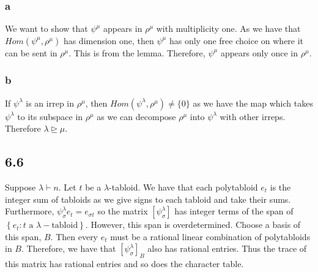 \documentclass[]{article}
\begin{document}
\subsubsection*{a}
We want to show that $\psi^\mu$ appears in $\rho^\mu$ with multiplicity one. As we have that $Hom(\psi^\mu, \rho^\mu)$ has dimension one, then $\psi^\mu$ has only one free choice on where it can be sent in $\rho^\mu$. This is from the lemma. Therefore, $\psi^\mu$ appears only once in $\rho^\mu$. 

\subsubsection*{b}
If $\psi^\lambda$ is an irrep in $\rho^\mu$, then $Hom(\psi^\lambda, \rho^\mu) \neq \{ 0 \}$ as we have the map which takes $\psi^\lambda$ to its subspace in $\rho^\mu$ as we can decompose $\rho^\mu$ into $\psi^\lambda$ with other irreps. Therefore $\lambda \unrhd  \mu$. 

\subsection*{6.6}
Suppose $\lambda \vdash n$. Let $t$ be a $\lambda$-tabloid.
We have that each polytabloid $e_t$ is the integer sum of tabloids as we give signs to each tabloid and take their sums. Furthermore, $\psi^\lambda_\sigma e_t = e_{\sigma t}$ so the matrix $\left[\psi^\lambda_\sigma\right]$ has integer terms of the span of $\left\{ e_{t}: t \text{ a } \lambda- \text{tabloid}\right\}$. However, this span is overdetermined. Choose a basis of this span, $B$. Then every $e_t$ must be a rational linear combination of polytabloids in $B$. Therefore, we have that $\left[\psi^\lambda_\sigma\right]_B$ also has rational entries. Thus the trace of this matrix has rational entries and so does the character table. 
\end{document}
